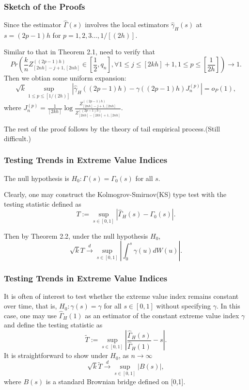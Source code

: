 \documentclass{beamer}
\newcommand{\suit}[1]{\left(#1\right)}
\newcommand{\abs}[1]{\left\vert#1\right\vert}
\begin{document}
\begin{frame}
    \frametitle{Sketch of the Proofs}
Since the estimator $\hat{\Gamma}(s)$ involves the local estimators $\hat{\gamma}_H(s)$ at $s=(2p-1)h$ for $p=1,2,3\dots,1/[(2h)]$.

Similar to that in Theorem 2.1, need to verify that 
{\color{blue}
$$
Pr\suit{\frac{k}{n} Z_{[2nh]-j+1,[2nh]}^{((2p-1)h)} \in [\frac{1}{2},q_n], \forall 1\le j \le [2kh]+1,1\le p\le [\frac{1}{2h}]} \to 1.
$$}
Then we obtian some uniform expansion:
$$
\sqrt{k} \sup_{1\le p \le [1/(2h)]} \abs{\hat{\gamma}_H((2p-1)h)-\gamma((2p-1)h)J_n^{(p)}}=o_P(1),
$$
where $J_n^{(p)}=\frac{1}{[2kh]}\log \frac{Z_{[2nh]-j+1,[2nh]}^{((2p-1)h)}}{Z_{[2nh]-[2kh]+1,[2nh]}^{((2p-1)h)}}.$

The rest of the proof follows by the theory of tail empirical process.(Still difficult.)

    

\end{frame}

\begin{frame}
    \frametitle{Testing Trends in Extreme Value Indices}
The null hypothesis is $H_0: \Gamma(s)=\Gamma_0(s)$ for all $s$.

\bigskip

Clearly, one may construct the Kolmogrov-Smirnov(KS) type test with the testing statistic defined as 
$$
T:=\sup_{s\in [0,1]} \abs{\hat{\Gamma}_H(s)-\Gamma_0(s)}.
$$

Then by Theorem 2.2, under the null hypothesis $H_0$,
$$
\sqrt{k} T \stackrel{d}{\rightarrow} \sup _{s \in[0,1]}\left|\int_{0}^{s} \gamma(u) d W(u)\right|.
$$
\end{frame}

\begin{frame}
    \frametitle{Testing Trends in Extreme Value Indices}
    It is often of interest to test whether the extreme value index remains constant over time, that is, $H_0 :\gamma(s)=\gamma$ for all $s \in [0,1]$ without specifying $\gamma$. In this case, one may use $\hat{\Gamma}_H(1)$  as an estimator of the constant extreme value index $\gamma$ and define the testing statistic as
    $$
    \tilde{T}:=\sup _{s \in[0,1]}\left|\frac{\hat{\Gamma}_{H}(s)}{\hat{\Gamma}_{H}(1)}-s\right|.
    $$
    It is straightforward to show under $H_0$, as $n \to \infty$
    $$
    \sqrt{k} \tilde{T} \stackrel{d}{\rightarrow} \sup _{s \in[0,1]}|B(s)|,
    $$
    where $B(s)$ is a standard Brownian bridge defined on [0,1].
\end{frame}
\end{document}
